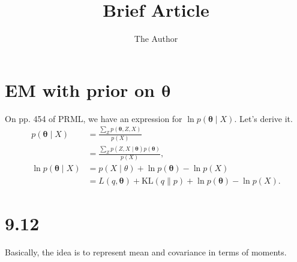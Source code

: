 \documentclass[12pt]{article}
\title{Brief Article}
\author{The Author}
\newcommand{\vect}[1]{\boldsymbol{#1}}
\begin{document}
\maketitle




\section{EM with prior on $\vect{\theta}$} %
\label{sec:em_with_prior_on_boldsymbol_}

On pp. 454 of PRML, we have an expression for $\ln p(\vect{\theta}\mid X)$. Let's derive it.
\begin{align}
p(\vect{\theta}\mid X) & = \frac{\sum_Z p(\vect{\theta},Z,X)}{p(X)}  \\
                       & = \frac{\sum_Z p(Z,X\mid \vect{\theta}) p(\vect{\theta}) }{p(X)},\\
\ln p(\vect{\theta}\mid X)   & = p(X\mid \theta) + \ln p(\vect{\theta}) - \ln p(X)\\
                             & = L(q,\vect{\theta}) + \mathrm{KL}(q \| p) + \ln p(\vect{\theta}) - \ln p(X).              
\end{align}






\section{9.12} %
\label{sec:9_12}

Basically, the idea is to represent mean and covariance in terms of moments.
\end{document}
